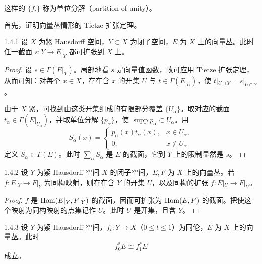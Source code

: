 这样的 $\{f_i\}$ 称为单位分解（partition of unity）。


首先，证明向量丛情形的 Tietze 扩张定理。

\begin{lemma*}{1.4.1}
  设 $X$ 为紧 Hausdorff 空间，$Y\subset X$ 为闭子空间，$E$ 为 $X$ 上的向量丛。此时任一截面 $s\colon Y\to E|_Y$ 都可扩张到 $X$ 上。
\end{lemma*}

\begin{proof}
  设 $s\in\Gamma(E|_Y)$。局部地看 $s$ 是向量值函数，故可应用 Tietze 扩张定理，从而可知：对每个 $x\in X$，存在含 $x$ 的开集 $U$ 与 $t\in\Gamma(E|_U)$，使 $t|_{U\cap Y}=s|_{U\cap Y}$。

  由于 $X$ 紧，可找到由这类开集组成的有限部分覆盖 $\{U_\alpha\}$。取对应的截面 $t_\alpha\in\Gamma(E|_{U_\alpha})$，并取单位分解 $\{p_\alpha\}$，使 $\operatorname{supp}p_\alpha\subset U_\alpha$。用
\[
S_\alpha(x)=\begin{cases}p_\alpha(x)t_\alpha(x), & x\in U_\alpha,\\ 0, & x\notin U_\alpha\end{cases}
\]
定义 $S_\alpha\in\Gamma(E)$。此时 $\sum_\alpha S_\alpha$ 是 $E$ 的截面，它到 $Y$ 上的限制显然是 $s$。
\end{proof}


\begin{lemma*}{1.4.2}
  设 $Y$ 为紧 Hausdorff 空间 $X$ 的闭子空间，$E, F$ 为 $X$ 上的向量丛。若 $f\colon E|_Y\to F|_Y$ 为同构映射，则存在含 $Y$ 的开集 $U$，以及同构的扩张 $f\colon E|_U\to F|_U$。
\end{lemma*}

\begin{proof}
  $f$ 是 $\operatorname{Hom}(E|_Y,F|_Y)$ 的截面，因而可扩张为 $\operatorname{Hom}(E,F)$ 的截面。把使这个映射为同构映射的点集记作 $U$。此时 $U$ 是开集，且含 $Y$。
\end{proof}

\begin{lemma*}{1.4.3}
  设 $Y$ 为紧 Hausdorff 空间，$f_t\colon Y\to X$（$0\le t\le1$）为同伦，$E$ 为 $X$ 上的向量丛。此时
\[
f_0^*E\cong f_1^*E
\]
成立。
\end{lemma*}

